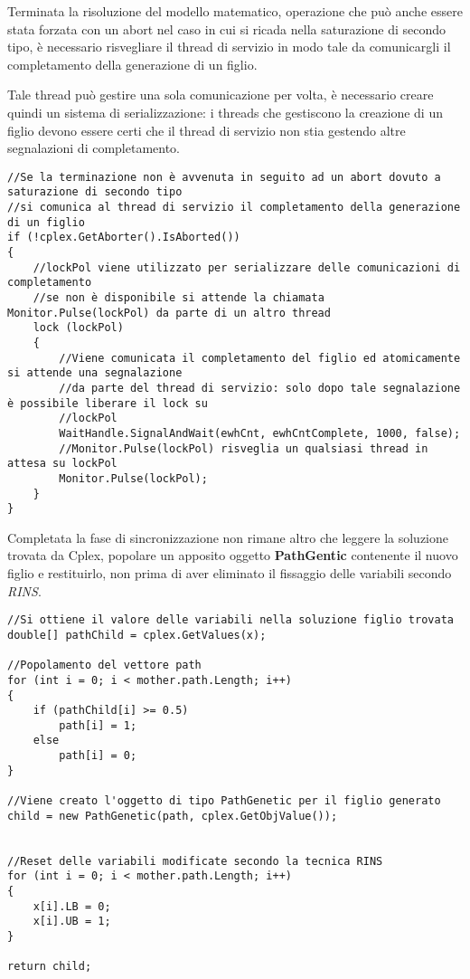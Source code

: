 \documentclass[11pt]{article}
\begin{document}
Terminata la risoluzione del modello matematico, operazione che può anche essere stata forzata con un abort nel caso in cui si ricada nella saturazione di secondo tipo, è necessario risvegliare il thread di servizio in modo tale da comunicargli il completamento della generazione di un figlio. 

Tale thread può gestire una sola comunicazione per volta, è necessario creare quindi un sistema di serializzazione: i threads che gestiscono la creazione di un figlio devono essere certi che il thread di servizio non stia gestendo altre segnalazioni di completamento.

\begin{lstlisting}
//Se la terminazione non è avvenuta in seguito ad un abort dovuto a saturazione di secondo tipo
//si comunica al thread di servizio il completamento della generazione di un figlio
if (!cplex.GetAborter().IsAborted())
{
    //lockPol viene utilizzato per serializzare delle comunicazioni di completamento
    //se non è disponibile si attende la chiamata Monitor.Pulse(lockPol) da parte di un altro thread
    lock (lockPol)
    {
        //Viene comunicata il completamento del figlio ed atomicamente si attende una segnalazione
        //da parte del thread di servizio: solo dopo tale segnalazione è possibile liberare il lock su
        //lockPol
        WaitHandle.SignalAndWait(ewhCnt, ewhCntComplete, 1000, false);
        //Monitor.Pulse(lockPol) risveglia un qualsiasi thread in attesa su lockPol
        Monitor.Pulse(lockPol);
    }
}
\end{lstlisting}

Completata la fase di sincronizzazione non rimane altro che leggere la soluzione trovata da Cplex, popolare un apposito oggetto \textbf{PathGentic} contenente il nuovo figlio e restituirlo, non prima di aver eliminato il fissaggio delle variabili secondo \textit{RINS}.

\begin{lstlisting}
//Si ottiene il valore delle variabili nella soluzione figlio trovata
double[] pathChild = cplex.GetValues(x);

//Popolamento del vettore path
for (int i = 0; i < mother.path.Length; i++)
{
    if (pathChild[i] >= 0.5)
        path[i] = 1;
    else
        path[i] = 0;
}

//Viene creato l'oggetto di tipo PathGenetic per il figlio generato
child = new PathGenetic(path, cplex.GetObjValue());


//Reset delle variabili modificate secondo la tecnica RINS
for (int i = 0; i < mother.path.Length; i++)
{
    x[i].LB = 0;
    x[i].UB = 1;
}

return child;
\end{lstlisting}
\end{document}
